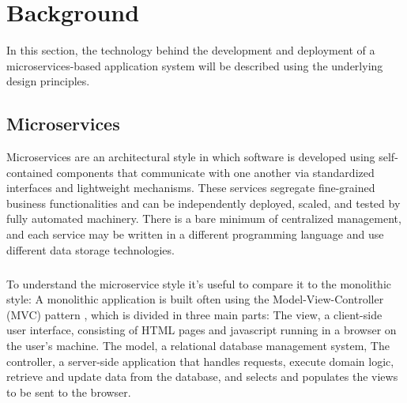 
%

\chapter{Background}
\label{cha:background}

In this section, the technology behind the development and deployment of a microservices-based
application system will be described using the underlying design principles.

\section{Microservices} %
\label{sec:microservices}

Microservices \cite{microservices, microservices2017tenets, microservicesTomorrow} are an architectural style in which software is developed using self-contained components that
communicate with one another via standardized interfaces and lightweight mechanisms.
These services segregate fine-grained business functionalities and can be independently deployed, scaled, and tested by fully automated machinery.
There is a bare minimum of centralized management, and each service may be written in a different programming language and use different data storage technologies.

\paragraph{}

To understand the microservice style it's useful to compare it to the monolithic style:
A monolithic application is built often using the Model-View-Controller (MVC) pattern \cite{mvc}, which is divided in three main parts:
The view, a client-side user interface, consisting of HTML pages and javascript running in a browser on the user's machine.
The model, a relational database management system,
The controller, a server-side application that handles requests, execute domain logic, retrieve and update data from the database, and selects and populates the views to be sent to the browser.

\paragraph{}

